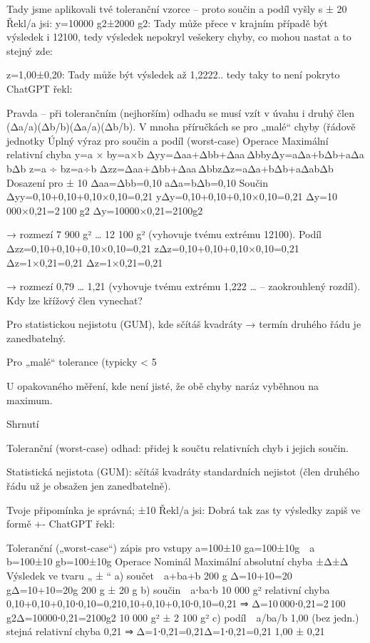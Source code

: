 {Tady jsme aplikovali tvé toleranční vzorce – proto součin a podíl vyšly s ± 20 %
Řekl/a jsi:
y=10000 g2±2000 g2​: Tady může přece v krajním případě být výsledek i 12100, tedy výsledek nepokryl vešekery chyby, co mohou nastat a to stejný zde:

z=1,00±0,20​: Tady může být výsledek až 1,2222.. tedy taky to není pokryto
ChatGPT řekl:

Pravda – při tolerančním (nejhorším) odhadu se musí vzít v úvahu i druhý člen
(Δa/a)(Δb/b)(Δa/a)(Δb/b). V mnoha příručkách se pro „malé“ chyby (řádově jednotky %
Úplný výraz pro součin a podíl (worst-case)
Operace	Maximální relativní chyba
y=a  ×  by=a×b	Δyy=Δaa+Δbb+Δaa ΔbbyΔy​=aΔa​+bΔb​+aΔa​bΔb​
z=a  ÷  bz=a÷b	Δzz=Δaa+Δbb+Δaa ΔbbzΔz​=aΔa​+bΔb​+aΔa​bΔb​
Dosazení pro ± 10 %
Δaa=Δbb=0,10
aΔa​=bΔb​=0,10
Součin
Δyy=0,10+0,10+0,10×0,10=0,21
yΔy​=0,10+0,10+0,10×0,10=0,21
Δy=10 000×0,21=2 100  g2
Δy=10000×0,21=2100g2

→ rozmezí 7 900 g² … 12 100 g²
(vyhovuje tvému extrému 12100).
Podíl
Δzz=0,10+0,10+0,10×0,10=0,21
zΔz​=0,10+0,10+0,10×0,10=0,21
Δz=1×0,21=0,21
Δz=1×0,21=0,21

→ rozmezí 0,79 … 1,21
(vyhovuje tvému extrému 1,222 … – zaokrouhlený rozdíl).
Kdy lze křížový člen vynechat?

    Pro statistickou nejistotu (GUM), kde sčítáš kvadráty → termín druhého řádu je zanedbatelný.

    Pro „malé“ tolerance (typicky < 5 %

    U opakovaného měření, kde není jisté, že obě chyby naráz vyběhnou na maximum.

Shrnutí

    Toleranční (worst-case) odhad: přidej k součtu relativních chyb i jejich součin.

    Statistická nejistota (GUM): sčítáš kvadráty standardních nejistot (člen druhého řádu už je obsažen jen zanedbatelně).

Tvoje připomínka je správná; ±10 %
Řekl/a jsi:
Dobrá tak zas ty výsledky zapiš ve formě +-
ChatGPT řekl:

Toleranční („worst‑case“) zápis pro vstupy
a=100±10  ga=100±10g a b=100±10  gb=100±10g
Operace	Nominál	Maximální absolutní chyba ±Δ±Δ	Výsledek ve tvaru „ ± “
a) součet a+ba+b	200 g	Δ=10+10=20  gΔ=10+10=20g	200 g ± 20 g
b) součin a⋅ba⋅b	10 000 g²	relativní chyba 0,10+0,10+0,10⋅0,10=0,210,10+0,10+0,10⋅0,10=0,21 ⇒ Δ=10 000⋅0,21=2 100  g2Δ=10000⋅0,21=2100g2	10 000 g² ± 2 100 g²
c) podíl a/ba/b	1,00 (bez jedn.)	stejná relativní chyba 0,21 ⇒ Δ=1⋅0,21=0,21Δ=1⋅0,21=0,21	1,00 ± 0,21

}

